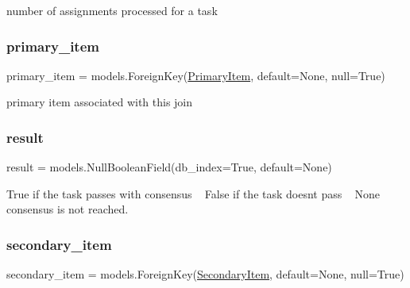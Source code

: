 number of assignments processed for a task 

\mbox{\label{classjoinapp_1_1models_1_1task__management__models_1_1_join_pair_task_aba1ada8f72cc448a543f1b01551172fa}} 
\subsubsection{\texorpdfstring{primary\_item}{primary\_item}}
{\footnotesize\ttfamily primary\+\_\+item = models.\+Foreign\+Key(\textquotesingle{}\mbox{\hyperlink{classjoinapp_1_1models_1_1items_1_1_primary_item}{Primary\+Item}}\textquotesingle{}, default=None, null=True)\hspace{0.3cm}{\ttfamily [static]}}



primary item associated with this join 

\mbox{\label{classjoinapp_1_1models_1_1task__management__models_1_1_join_pair_task_a937d4dd628a8858b443a399410d2600b}} 
\subsubsection{\texorpdfstring{result}{result}}
{\footnotesize\ttfamily result = models.\+Null\+Boolean\+Field(db\+\_\+index=True, default=None)\hspace{0.3cm}{\ttfamily [static]}}



True if the task passes with consensus ~\newline
 False if the task doesn\textquotesingle{}t pass ~\newline
 None consensus is not reached. 

\mbox{\label{classjoinapp_1_1models_1_1task__management__models_1_1_join_pair_task_a0a9178a9cf48b964cab2025b9788a615}} 
\subsubsection{\texorpdfstring{secondary\_item}{secondary\_item}}
{\footnotesize\ttfamily secondary\+\_\+item = models.\+Foreign\+Key(\textquotesingle{}\mbox{\hyperlink{classjoinapp_1_1models_1_1items_1_1_secondary_item}{Secondary\+Item}}\textquotesingle{}, default=None, null=True)\hspace{0.3cm}{\ttfamily [static]}}



